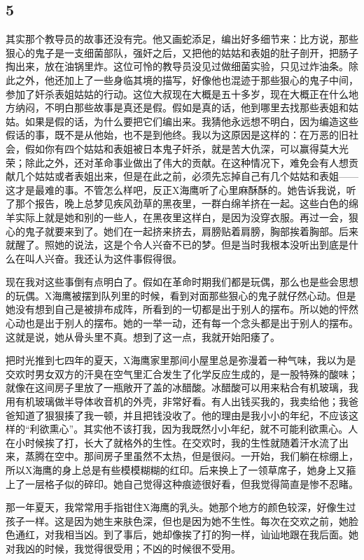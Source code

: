 \subsection{5} 

其实那个教导员的故事还没有完。他又画蛇添足，编出好多细节来：比方说，那些狠心的鬼子是一支细菌部队，强奸之后，又把他的姑姑和表姐的肚子剖开，把肠子掏出来，放在油锅里炸。这位可怜的教导员没见过做细菌实验，只见过炸油条。除此之外，他还加上了一些身临其境的描写，好像他也混迹于那些狠心的鬼子中间，参加了奸杀表姐姑姑的行动。这位大叔现在大概是五十多岁，现在大概正在什么地方纳闷，不明白那些故事是真还是假。假如是真的话，他到哪里去找那些表姐和姑姑。如果是假的话，为什么要把它们编出来。我猜他永远想不明白，因为编造这些假话的事，既不是从他始，也不是到他终。我以为这原因是这样的：在万恶的旧社会，假如你有四个姑姑和表姐被日本鬼子奸杀，就是苦大仇深，可以赢得莫大光荣；除此之外，还对革命事业做出了伟大的贡献。在这种情况下，难免会有人想贡献几个姑姑或者表姐出来，但是在此之前，必须先忘掉自己有几个姑姑和表姐——这才是最难的事。不管怎么样吧，反正X海鹰听了心里麻酥酥的。她告诉我说，听了那个报告，晚上总梦见疾风劲草的黑夜里，一群白绵羊挤在一起。这些白色的绵羊实际上就是她和别的一些人，在黑夜里这样白，是因为没穿衣服。再过一会，狠心的鬼子就要来到了。她们在一起挤来挤去，肩膀贴着肩膀，胸部挨着胸部。后来就醒了。照她的说法，这是个令人兴奋不已的梦。但是当时我根本没听出到底是什么在叫人兴奋。我还认为这件事假得很。 

现在我对这些事倒有点明白了。假如在革命时期我们都是玩偶，那么也是些会思想的玩偶。X海鹰被摆到队列里的时候，看到对面那些狠心的鬼子就仔然心动。但是她没有想到自己是被排布成阵，所看到的一切都是出于别人的摆布。所以她的怦然心动也是出于别人的摆布。她的一举一动，还有每一个念头都是出于别人的摆布。这就是说，她从骨头里不真。想到了这一点，我就开始阳痿了。 

把时光推到七四年的夏天，X海鹰家里那间小屋里总是弥漫着一种气味，我以为是交欢时男女双方的汗臭在空气里汇合发生了化学反应生成的，是一股特殊的酸味；就像在这间房子里放了一瓶敞开了盖的冰醋酸。冰醋酸可以用来粘合有机玻璃，我用有机玻璃做半导体收音机的外壳，非常好看。有人出钱买我的，我卖给他；我爸爸知道了狠狠揍了我一顿，并且把钱没收了。他的理由是我小小的年纪，不应该这样的“利欲熏心”。其实他不该打我，因为我既然小小年纪，就不可能利欲熏心。人在小时候挨了打，长大了就格外的生性。在交欢时，我的生性就随着汗水流了出来，蒸腾在空中。那间房子里虽然不太热，但是很闷。一开始，我们躺在棕绷上，所以X海鹰的身上总是有些模模糊糊的红印。后来换上了一领草席子，她身上又箍上了一层格子似的碎印。她自己觉得这种痕迹很好看，但我觉得简直是惨不忍睹。 

那一年夏天，我常常用手指钳住X海鹰的乳头。她那个地方的颜色较深，好像生过孩子一样。这是因为她生来肤色深，但也是因为她不生性。每次在交欢之前，她脸色通红，对我相当凶。到了事后，她却像挨了打的狗一样，讪讪地跟在我后面。她对我凶的时候，我觉得很受用；不凶的时候很不受用。 

